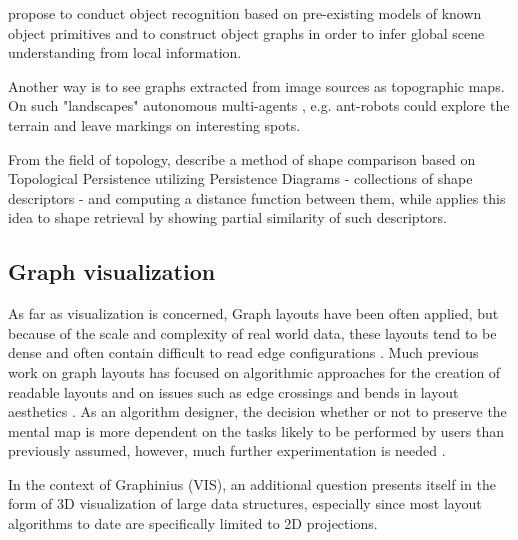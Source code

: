 		\cite{LeeObjectGraphs2012} propose to conduct object recognition based on pre-existing models of known object primitives and to construct object graphs in order to infer global scene understanding from local information.
		
		Another way is to see graphs extracted from image sources as topographic maps. On such "landscapes" autonomous multi-agents \citep{Kasaiezadeh2013MultiagentImage} \citep{Olfati-Saber2007MultiAgents}, e.g. ant-robots \citep{WagnerBruckstein2001FromAntsToAgents} could explore the terrain and leave markings on interesting spots.
		
		From the field of topology, \citep{Cerri2012} describe a method of shape comparison based on Topological Persistence utilizing Persistence Diagrams - collections of shape descriptors - and computing a distance function between them, while \citep{DiFabio2012} applies this idea to shape retrieval by showing partial similarity of such descriptors.
		
		\subsection{Graph visualization}
		\label{ssect:graph_visualization}
		
		As far as visualization is concerned, Graph layouts have been often applied, but because of the scale and complexity of real world data, these layouts tend to be dense and often contain difficult to read edge configurations \citep{HermanMelanconMarshall2000GraphVisIEEE}. Much previous work on graph layouts has focused on algorithmic approaches for the creation of readable layouts and on issues such as edge crossings and bends in layout aesthetics \citep{Purchase1997GraphDrawing}. As an algorithm designer, the decision whether or not to preserve the mental map is more dependent on the tasks likely to be performed by users than previously assumed, however, much further experimentation is needed \citep{ArchambaultPurchase2013MentalMap, StahlGabrys2013GraphbasedKDD}.
		
		In the context of Graphinius (VIS), an additional question presents itself in the form of 3D visualization of large data structures, especially since most layout algorithms to date are specifically limited to 2D projections.
		
		
	
